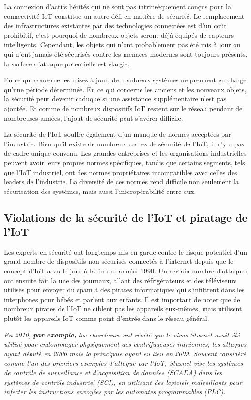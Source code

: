 La connexion d’actifs hérités qui ne sont pas intrinsèquement conçus pour la connectivité IoT constitue un autre défi en matière de sécurité. Le remplacement des infrastructures existantes par des technologies connectées est d’un coût prohibitif, c’est pourquoi de nombreux objets seront déjà équipés de capteurs intelligents. Cependant, les objets qui n’ont probablement pas été mis à jour ou qui n’ont jamais été sécurisés contre les menaces modernes sont toujours présents, la surface d’attaque potentielle est élargie.

En ce qui concerne les mises à jour, de nombreux systèmes ne prennent en charge qu’une période déterminée. En ce qui concerne les anciens et les nouveaux objets, la sécurité peut devenir caduque si une assistance supplémentaire n’est pas ajoutée. Et comme de nombreux dispositifs IoT restent sur le réseau pendant de nombreuses années, l’ajout de sécurité peut s’avérer difficile.

La sécurité de l’IoT souffre également d’un manque de normes acceptées par l’industrie. Bien qu’il existe de nombreux cadres de sécurité de l’IoT, il n’y a pas de cadre unique convenu. Les grandes entreprises et les organisations industrielles peuvent avoir leurs propres normes spécifiques, tandis que certains segments, tels que l’IoT industriel, ont des normes propriétaires incompatibles avec celles des leaders de l’industrie. La diversité de ces normes rend difficile non seulement la sécurisation des systèmes, mais aussi l’interopérabilité entre eux.

\subsection*{Violations de la sécurité de l’IoT et piratage de l’IoT}
Les experts en sécurité ont longtemps mis en garde contre le risque potentiel d’un grand nombre de dispositifs non sécurisés connectés à l’internet depuis que le concept d’IoT a vu le jour à la fin des années 1990. Un certain nombre d’attaques ont ensuite fait la une des journaux, allant des réfrigérateurs et des téléviseurs utilisés pour envoyer du spam à des pirates informatiques qui s’infiltrent dans les interphones pour bébés et parlent aux enfants. Il est important de noter que de nombreux pirates de l’IoT ne ciblent pas les appareils eux-mêmes, mais utilisent plutôt les appareils IoT comme point d’entrée dans le réseau général.

\textit{En 2010, \textbf{par exemple,} les chercheurs ont révélé que le virus Stuxnet avait été utilisé pour endommager physiquement des centrifugeuses iraniennes, les attaques ayant débuté en 2006 mais la principale ayant eu lieu en 2009. Souvent considéré comme l’un des premiers exemples d’attaque par l’IoT, Stuxnet vise les systèmes de contrôle de surveillance et d’acquisition de données (SCADA) dans les systèmes de contrôle industriel (SCI), en utilisant des logiciels malveillants pour infecter les instructions envoyées par les automates programmables (PLC).}


